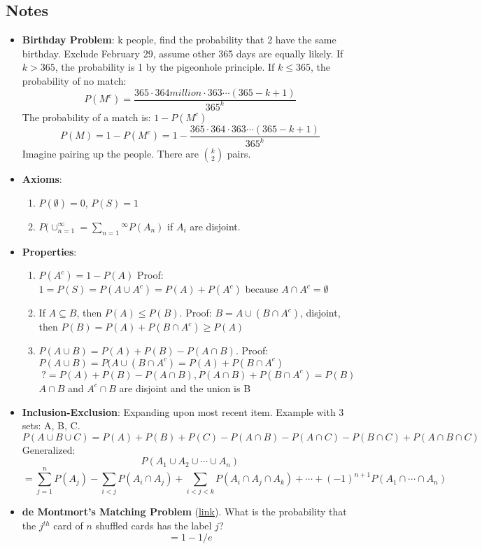 \documentclass[11pt, oneside]{article}   	%
\begin{document}
	\subsection{Notes}
	\begin{itemize}
		\item \textbf{Birthday Problem}: k people, find the probability that 2 have the same birthday. Exclude February 29, assume other 365 days are equally likely.
			If $k > 365$, the probability is 1 by the pigeonhole principle.
			If $k \leq 365$, the probability of no match:
				\[
					P(M^c)= \frac{365 \cdot 364 million\cdot 363 \cdots (365 - k + 1)}{365^k}
				\]
			The probability of a match is: $1 - P(M^c)$
				\[
					P(M) = 1 - P(M^c) = 1 - \frac{365 \cdot 364 \cdot 363 \cdots (365 - k + 1)}{365^k}
				\]
			Imagine pairing up the people. There are $\binom{k}{2}$ pairs.
		\item \textbf{Axioms}:
			\begin{enumerate}
				\item $P(\emptyset) = 0$, $P(S) = 1$
				\item $P( \cup_{n=1}^{\infty} = \sum_{n=1}{^\infty}P(A_n)$ if $A_i$ are disjoint.
			\end{enumerate}
		\item \textbf{Properties}:
			\begin{enumerate}
				\item $P(A^c) = 1 - P(A)$ Proof: $1 = P(S) = P(A \cup A^c) = P(A) + P(A^c)$ because $A \cap A^c = \emptyset$
				\item If $ A \subseteq B$, then $P(A) \leq P(B)$. Proof: $B = A \cup (B \cap A^c)$, disjoint, then $P(B) = P(A) + P(B \cap A^c) \geq P(A)$
				\item $P(A \cup B) = P(A) + P(B) - P(A \cap B)$. Proof: $P(A \cup B) = P(A \cup ( B \cap A^c ) = P(A) + P(B \cap A^c)$
					\[
					 	?= P(A) + P(B) - P(A \cap B), P(A \cap B) + P(B \cap A^c) = P(B)
					\]
					$A \cap B$ and $A^c \cap B$ are disjoint and the union is B
			\end{enumerate}
		\item \textbf{Inclusion-Exclusion}: Expanding upon most recent item. Example with 3 sets: A, B, C.
			\[
				P(A \cup B \cup C) = P(A) + P(B) + P(C) - P(A \cap B) - P(A \cap C) - P(B \cap C) + P(A \cap B \cap C)
			\]
			Generalized:
			\[
				P(A_1 \cup A_2 \cup \cdots \cup A_n)
			\]
			\[
				= \sum_{j=1}^{n}P(A_j) - \sum_{i < j}P(A_i \cap A_j) + \sum_{i < j < k}P(A_i \cap A_j \cap A_k) + \cdots + (-1)^{n+1}P(A_1 \cap \cdots \cap A_n)
			\]
		\item \textbf{de Montmort's Matching Problem} (\href{http://www.math.uah.edu/stat/urn/Matching.html}{link}).
			What is the probability that the $j^{th}$ card of $n$ shuffled cards has the label $j$?
			\[
				= 1 - 1/e
			\]
	\end{itemize}
\end{document}
